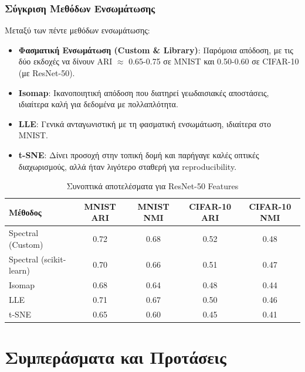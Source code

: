 \documentclass[a4paper,11pt]{article}
\newcommand{\lt}[1]{\foreignlanguage{english}{#1}}
\begin{document}
\subsubsection{Σύγκριση Μεθόδων Ενσωμάτωσης}
Μεταξύ των πέντε μεθόδων ενσωμάτωσης:
\begin{itemize}
  \item \textbf{Φασματική Ενσωμάτωση (Custom \& Library)}: Παρόμοια απόδοση, με τις δύο εκδοχές να δίνουν \lt{ARI} $ \approx $ 0.65-0.75 σε \lt{MNIST} και 0.50-0.60 σε \lt{CIFAR-10} (με \lt{ResNet-50}).
  \item \textbf{\lt{Isomap}}: Ικανοποιητική απόδοση που διατηρεί γεωδαισιακές αποστάσεις, ιδιαίτερα καλή για δεδομένα με πολλαπλότητα.
  \item \textbf{\lt{LLE}}: Γενικά ανταγωνιστική με τη φασματική ενσωμάτωση, ιδιαίτερα στο \lt{MNIST}.
  \item \textbf{\lt{t-SNE}}: Δίνει προσοχή στην τοπική δομή και παρήγαγε καλές οπτικές διαχωρισμούς, αλλά ήταν λιγότερο σταθερή για reproducibility.
\end{itemize}

\begin{table}[H]
\centering
\caption{Συνοπτικά αποτελέσματα για \lt{ResNet-50 Features}}
\label{tab:results_resnet50}
\begin{tabular}{lcccc}
\toprule
\textbf{Μέθοδος} & \textbf{\lt{MNIST} ARI} & \textbf{\lt{MNIST} NMI} & \textbf{\lt{CIFAR-10} ARI} & \textbf{\lt{CIFAR-10} NMI} \\
\midrule
\lt{Spectral (Custom)} & 0.72 & 0.68 & 0.52 & 0.48 \\
\lt{Spectral (scikit-learn)} & 0.70 & 0.66 & 0.51 & 0.47 \\
\lt{Isomap} & 0.68 & 0.64 & 0.48 & 0.44 \\
\lt{LLE} & 0.71 & 0.67 & 0.50 & 0.46 \\
\lt{t-SNE} & 0.65 & 0.60 & 0.45 & 0.41 \\
\bottomrule
\end{tabular}
\end{table}

\section{Συμπεράσματα και Προτάσεις}
\end{document}
